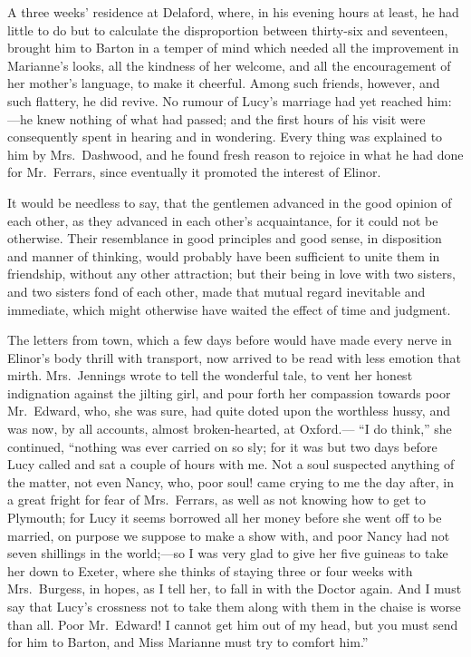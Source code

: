 A three weeks' residence at Delaford, where,
in his evening hours at least, he had little to do
but to calculate the disproportion between thirty-six
and seventeen, brought him to Barton in a temper of mind
which needed all the improvement in Marianne's looks,
all the kindness of her welcome, and all the encouragement
of her mother's language, to make it cheerful.
Among such friends, however, and such flattery, he did revive.
No rumour of Lucy's marriage had yet reached him:---he knew
nothing of what had passed; and the first hours of his
visit were consequently spent in hearing and in wondering.
Every thing was explained to him by Mrs.\ Dashwood,
and he found fresh reason to rejoice in what he had done
for Mr.\ Ferrars, since eventually it promoted the interest
of Elinor.

It would be needless to say, that the gentlemen advanced
in the good opinion of each other, as they advanced in each
other's acquaintance, for it could not be otherwise.
Their resemblance in good principles and good sense,
in disposition and manner of thinking, would probably
have been sufficient to unite them in friendship,
without any other attraction; but their being in love
with two sisters, and two sisters fond of each other,
made that mutual regard inevitable and immediate,
which might otherwise have waited the effect of time
and judgment.

The letters from town, which a few days before would
have made every nerve in Elinor's body thrill with transport,
now arrived to be read with less emotion that mirth.
Mrs.\ Jennings wrote to tell the wonderful tale, to vent her
honest indignation against the jilting girl, and pour forth
her compassion towards poor Mr.\ Edward, who, she was sure,
had quite doted upon the worthless hussy, and was now,
by all accounts, almost broken-hearted, at Oxford.---%
``I do think,'' she continued, ``nothing was ever carried
on so sly; for it was but two days before Lucy called
and sat a couple of hours with me.  Not a soul suspected
anything of the matter, not even Nancy, who, poor soul!
came crying to me the day after, in a great fright
for fear of Mrs.\ Ferrars, as well as not knowing how to
get to Plymouth; for Lucy it seems borrowed all her
money before she went off to be married, on purpose
we suppose to make a show with, and poor Nancy had not
seven shillings in the world;---so I was very glad to give
her five guineas to take her down to Exeter, where she
thinks of staying three or four weeks with Mrs.\ Burgess,
in hopes, as I tell her, to fall in with the Doctor again.
And I must say that Lucy's crossness not to take them
along with them in the chaise is worse than all.
Poor Mr.\ Edward! I cannot get him out of my head, but you
must send for him to Barton, and Miss Marianne must try to
comfort him.''

